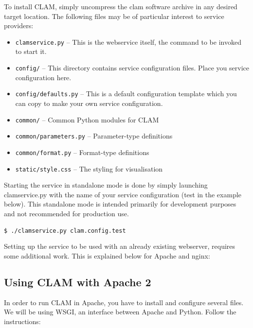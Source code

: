 \documentclass[a4paper,12pt]{report}
\begin{document}
To install CLAM, simply uncompress the clam software archive in any desired target location. The following files may be of particular interest to service providers:

\begin{itemize}
\item \texttt{clamservice.py} -- This is the webservice itself, the command to be invoked to start it.
\item \texttt{config/} -- This directory contains service configuration files. Place you service configuration here.
\item \texttt{config/defaults.py} -- This is a default configuration template which you can copy to make your own service configuration.
\item \texttt{common/} -- Common Python modules for CLAM
\item \texttt{common/parameters.py} -- Parameter-type definitions
\item \texttt{common/format.py} -- Format-type definitions
\item \texttt{static/style.css} -- The styling for visualisation

\end{itemize}

Starting the service in standalone mode is done by simply launching clamservice.py with the name of your service configuration (test in the example below). This standalone mode is intended primarily for development purposes and not recommended for production use.

\texttt{\$ ./clamservice.py clam.config.test}

Setting up the service to be used with an already existing webserver, requires some additional work. This is explained below for Apache and nginx:

\subsection{Using CLAM with Apache 2}

In order to run CLAM in Apache, you have to install and configure several files. We will be using WSGI, an interface between Apache and Python. Follow the instructions:
\end{document}

